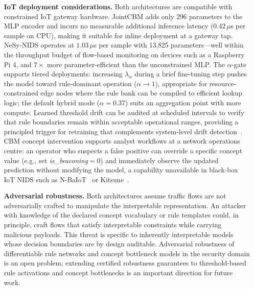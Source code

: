 \documentclass[journal]{IEEEtran}
\begin{document}
\textbf{IoT deployment considerations.}
Both architectures are compatible with constrained IoT gateway hardware.
JointCBM adds only 296 parameters to the MLP encoder and incurs no
measurable additional inference latency ($0.42\,\mu$s per sample on CPU),
making it suitable for inline deployment at a gateway tap.
NeSy-NIDS operates at $1.03\,\mu$s per sample with 13{,}825
parameters---well within the throughput budget of flow-based monitoring
on devices such as a Raspberry Pi 4, and $7{\times}$ more
parameter-efficient than the unconstrained MLP. The $\alpha$-gate
supports tiered deployments: increasing $\lambda_\alpha$ during a brief
fine-tuning step pushes the model toward rule-dominant operation
($\alpha\to1$), appropriate for resource-constrained edge nodes where
the rule bank can be compiled to efficient lookup logic; the default
hybrid mode ($\alpha{=}0.37$) suits an aggregation point with more
compute. Learned threshold drift can be audited at scheduled intervals
to verify that rule boundaries remain within acceptable operational
ranges, providing a principled trigger for retraining that complements
system-level drift detection~\cite{han2023owad}. CBM concept
intervention supports analyst workflows at a network operations centre:
an operator who suspects a false positive can override a specific
concept value (e.g., set \textit{is\_beaconing}${=}0$) and immediately
observe the updated prediction without modifying the model, a capability
unavailable in black-box IoT NIDS such as N-BaIoT~\cite{meidan2018nbaiot}
or Kitsune~\cite{mirsky2018kitsune}.

\textbf{Adversarial robustness.}
Both architectures assume traffic flows are not adversarially crafted to
manipulate the interpretable representation. An attacker with knowledge
of the declared concept vocabulary or rule templates could, in principle,
craft flows that satisfy interpretable constraints while carrying malicious
payloads. This threat is specific to inherently interpretable models whose
decision boundaries are by design auditable.
Adversarial robustness of differentiable rule networks and concept
bottleneck models in the security domain is an open problem; extending
certified robustness guarantees to threshold-based rule activations and
concept bottlenecks is an important direction for future work.
\end{document}
